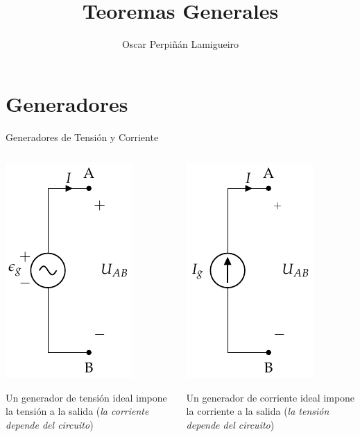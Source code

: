 \documentclass[xcolor={usenames,svgnames,dvipsnames}]{beamer}
\author{Oscar Perpiñán Lamigueiro}
\date{}
\title{Teoremas Generales}
\begin{document}
\maketitle

\section{Generadores}
\label{sec:orga855616}

\begin{frame}[label={sec:org65e58a9}]{Generadores de Tensión y Corriente}
\begin{columns}
\begin{column}{0.5\columnwidth}
\begin{center}
\includegraphics[height=0.6\textheight]{figs/FuenteTensionIdeal.pdf}
\end{center}
Un \alert{generador de tensión ideal} impone la tensión a la salida (\emph{la corriente depende del circuito})
\end{column}

\begin{column}{0.5\columnwidth}
\begin{center}
\includegraphics[height=0.6\textheight]{figs/FuenteCorrienteIdeal.pdf}
\end{center}
Un \alert{generador de corriente ideal} impone la corriente a la salida (\emph{la tensión depende del circuito})
\end{column}
\end{columns}
\end{frame}
\end{document}
